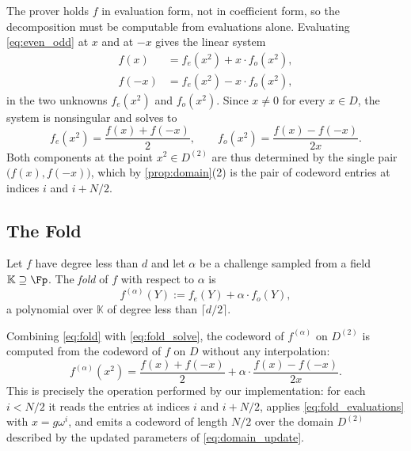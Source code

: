 The prover holds $f$ in evaluation form, not in coefficient form, so
the decomposition must be computable from evaluations alone. Evaluating
\cref{eq:even_odd} at $x$ and at $-x$ gives the linear
system~\cite[Section~3.9.2]{ethSTARK}
%
\begin{equation}
\label{eq:fold_system}
\begin{aligned}
f(x)  &= f_{e}(x^2) + x \cdot f_{o}(x^2), \\
f(-x) &= f_{e}(x^2) - x \cdot f_{o}(x^2),
\end{aligned}
\end{equation}
%
in the two unknowns $f_{e}(x^2)$ and $f_{o}(x^2)$. Since $x \neq 0$ for
every $x \in D$, the system is nonsingular and solves to
%
\begin{equation}
\label{eq:fold_solve}
f_{e}(x^2) = \frac{f(x) + f(-x)}{2},
\qquad
f_{o}(x^2) = \frac{f(x) - f(-x)}{2x}.
\end{equation}
%
Both components at the point $x^2 \in D^{(2)}$ are thus determined by
the single pair $\bigl(f(x), f(-x)\bigr)$, which by
\cref{prop:domain}(2) is the pair of codeword entries at indices $i$
and $i + N/2$.
 
 
\subsection{The Fold}
\label{subsec:the_fold}
 
\begin{definition}
\label{def:fold}
Let $f$ have degree less than $d$ and let $\alpha$ be a challenge
sampled from a field $\mathbb{K} \supseteq \Fp$. The \emph{fold} of $f$
with respect to $\alpha$ is
%
\begin{equation}
\label{eq:fold}
f^{(\alpha)}(Y) := f_{e}(Y) + \alpha \cdot f_{o}(Y) ,
\end{equation}
%
a polynomial over $\mathbb{K}$ of degree less than $\lceil d/2 \rceil$.
\end{definition}
 
Combining \cref{eq:fold} with \cref{eq:fold_solve}, the codeword of
$f^{(\alpha)}$ on $D^{(2)}$ is computed from the codeword of $f$ on $D$
without any interpolation:
%
\begin{equation}
\label{eq:fold_evaluations}
f^{(\alpha)}(x^2)
  = \frac{f(x) + f(-x)}{2}
  + \alpha \cdot \frac{f(x) - f(-x)}{2x} .
\end{equation}
%
This is precisely the operation performed by our implementation: for
each $i < N/2$ it reads the entries at indices $i$ and $i + N/2$,
applies \cref{eq:fold_evaluations} with $x = g\omega^{i}$, and emits a
codeword of length $N/2$ over the domain $D^{(2)}$ described by the
updated parameters of \cref{eq:domain_update}.
 
